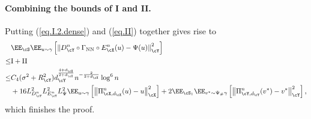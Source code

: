 \documentclass[11pt]{article} %
\begin{document}
\paragraph{Combining the bounds of I and II.}
Putting (\ref{eq.I.2.dense}) and (\ref{eq.II})  together gives rise to
\begin{align}
	&\EE_{\cS}\EE_{u\sim \gamma}\left[ \left\|D_{\cY}^n\circ \Gamma_{\rm NN} \circ E_{\cX}^n(u)- \Psi(u)\right\|_{\cY}^2 \right] \nonumber\\
	\leq & {\rm I}+{\rm II}\nonumber\\
	\leq &C_{4}(\sigma^2+R_{\cY}^2)d_{\cY}^{\frac{4+d_{\cX}}{2+d_{\cX}}}n^{-\frac{2}{2+d_{\cX}}}\log^6 n  \nonumber\\
	& +  16L_{D^n_{\cY}}^2 L_{E^n_{\cY}}^2L_{\Psi}^2\EE_{u\sim \gamma}\left[ \left\| \Pi_{\cX,d_{\cX}}^n(u)- u\right\|_{\cX}^2\right]+2\EE_{\cS_1}\EE_{v^*\sim \Psi_{\#}\gamma}\left[ \left\|\Pi_{\cY,d_{\cY}}^n(v^*)- v^*\right\|_{\cY}^2\right],
	\label{eq.error.general.1.dense}
\end{align}
which finishes the proof.
\end{document}
